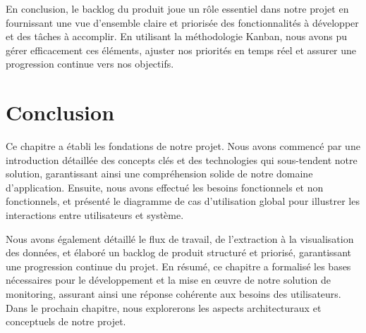 \par En conclusion, le backlog du produit joue un rôle essentiel dans notre projet en fournissant une vue d'ensemble claire et priorisée des fonctionnalités à développer et des tâches à accomplir. 
En utilisant la méthodologie Kanban, nous avons pu gérer efficacement ces éléments, ajuster nos priorités en temps réel et assurer une progression continue vers nos objectifs.

\vspace{-1cm}
\section*{Conclusion}
 \par Ce chapitre a établi les fondations de notre projet.  Nous avons commencé par une introduction détaillée des concepts clés et des technologies qui sous-tendent notre solution, garantissant ainsi une compréhension solide de notre domaine d'application. 
 Ensuite, nous avons effectué les besoins fonctionnels et non fonctionnels, et présenté le diagramme de cas d'utilisation global pour illustrer les interactions entre utilisateurs et système. 

\par Nous avons également détaillé le flux de travail, de l'extraction à la visualisation des données, et élaboré un backlog de produit structuré et priorisé, 
garantissant une progression continue du projet. 
En résumé, ce chapitre a formalisé les bases nécessaires pour le développement et la mise en œuvre de notre solution de monitoring, assurant ainsi une réponse cohérente aux besoins des utilisateurs. Dans le prochain chapitre, nous explorerons les aspects architecturaux et conceptuels de notre projet.

